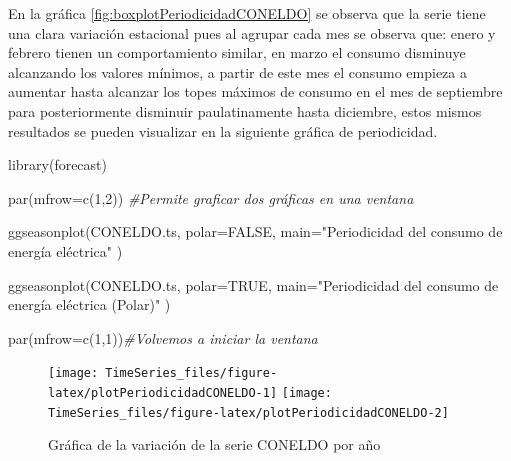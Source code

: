 \documentclass[
  spanish,
]{book}
\newenvironment{Shaded}{\begin{snugshade}}{\end{snugshade}}
\newcommand{\AttributeTok}[1]{\textcolor[rgb]{0.77,0.63,0.00}{#1}}
\newcommand{\CommentTok}[1]{\textcolor[rgb]{0.56,0.35,0.01}{\textit{#1}}}
\newcommand{\ConstantTok}[1]{\textcolor[rgb]{0.00,0.00,0.00}{#1}}
\newcommand{\DecValTok}[1]{\textcolor[rgb]{0.00,0.00,0.81}{#1}}
\newcommand{\FunctionTok}[1]{\textcolor[rgb]{0.00,0.00,0.00}{#1}}
\newcommand{\NormalTok}[1]{#1}
\newcommand{\StringTok}[1]{\textcolor[rgb]{0.31,0.60,0.02}{#1}}
\theoremstyle{remark}
\begin{document}
En la gráfica \ref{fig:boxplotPeriodicidadCONELDO} se observa que la serie tiene una clara variación estacional pues al agrupar cada mes se observa que: enero y febrero tienen un comportamiento similar, en marzo el consumo disminuye alcanzando los valores mínimos, a partir de este mes el consumo empieza a aumentar hasta alcanzar los topes máximos de consumo en el mes de septiembre para posteriormente disminuir paulatinamente hasta diciembre, estos mismos resultados se pueden visualizar en la siguiente gráfica de periodicidad.

\begin{Shaded}
\begin{Highlighting}[]
\FunctionTok{library}\NormalTok{(forecast)}

\FunctionTok{par}\NormalTok{(}\AttributeTok{mfrow=}\FunctionTok{c}\NormalTok{(}\DecValTok{1}\NormalTok{,}\DecValTok{2}\NormalTok{)) }\CommentTok{\#Permite graficar dos gráficas en una ventana}

\FunctionTok{ggseasonplot}\NormalTok{(CONELDO.ts,}
             \AttributeTok{polar=}\ConstantTok{FALSE}\NormalTok{, }
             \AttributeTok{main=}\StringTok{"Periodicidad del consumo de energía eléctrica"}\NormalTok{ )}

\FunctionTok{ggseasonplot}\NormalTok{(CONELDO.ts,}
             \AttributeTok{polar=}\ConstantTok{TRUE}\NormalTok{,}
             \AttributeTok{main=}\StringTok{"Periodicidad del consumo de energía eléctrica (Polar)"}\NormalTok{ )}

\FunctionTok{par}\NormalTok{(}\AttributeTok{mfrow=}\FunctionTok{c}\NormalTok{(}\DecValTok{1}\NormalTok{,}\DecValTok{1}\NormalTok{))}\CommentTok{\#Volvemos a iniciar la ventana }
\end{Highlighting}
\end{Shaded}

\begin{figure}

{\centering \texttt{[image: TimeSeries\_files/figure-latex/plotPeriodicidadCONELDO-1]} \texttt{[image: TimeSeries\_files/figure-latex/plotPeriodicidadCONELDO-2]} 

}

\caption{Gráfica de la variación de la serie CONELDO por año}\label{fig:plotPeriodicidadCONELDO}
\end{figure}
\end{document}
